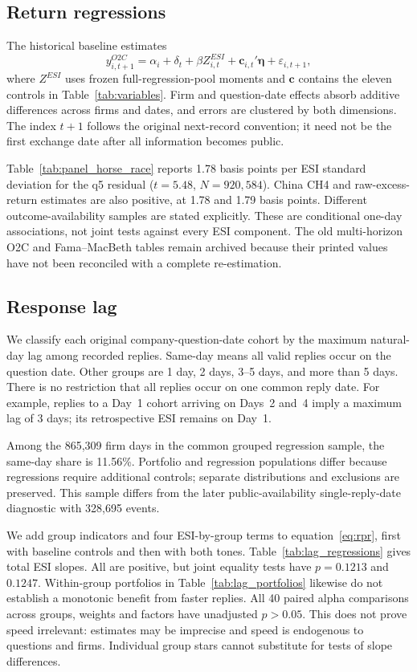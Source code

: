 \subsection{Return regressions}
The historical baseline estimates
\begin{equation}
y^{O2C}_{i,t+1}=\alpha_i+\delta_t+\beta Z^{ESI}_{i,t}+\boldsymbol c_{i,t}'\boldsymbol\eta+\varepsilon_{i,t+1},\label{eq:rpr}
\end{equation}
where $Z^{ESI}$ uses frozen full-regression-pool moments and $\boldsymbol c$ contains the eleven controls in Table~\ref{tab:variables}. Firm and question-date effects absorb additive differences across firms and dates, and errors are clustered by both dimensions. The index $t+1$ follows the original next-record convention; it need not be the first exchange date after all information becomes public.

Table~\ref{tab:panel_horse_race} reports 1.78 basis points per ESI standard deviation for the q5 residual ($t=5.48$, $N=920{,}584$). China CH4 and raw-excess-return estimates are also positive, at 1.78 and 1.79 basis points. Different outcome-availability samples are stated explicitly. These are conditional one-day associations, not joint tests against every ESI component. The old multi-horizon O2C and Fama--MacBeth tables remain archived because their printed values have not been reconciled with a complete re-estimation.


\subsection{Response lag}
We classify each original company-question-date cohort by the maximum natural-day lag among recorded replies. Same-day means all valid replies occur on the question date. Other groups are 1 day, 2 days, 3--5 days, and more than 5 days. There is no restriction that all replies occur on one common reply date. For example, replies to a Day~1 cohort arriving on Days~2 and~4 imply a maximum lag of 3 days; its retrospective ESI remains on Day~1.

Among the 865,309 firm days in the common grouped regression sample, the same-day share is 11.56\%. Portfolio and regression populations differ because regressions require additional controls; separate distributions and exclusions are preserved. This sample differs from the later public-availability single-reply-date diagnostic with 328,695 events.

We add group indicators and four ESI-by-group terms to equation~\eqref{eq:rpr}, first with baseline controls and then with both tones. Table~\ref{tab:lag_regressions} gives total ESI slopes. All are positive, but joint equality tests have $p=0.1213$ and $0.1247$. Within-group portfolios in Table~\ref{tab:lag_portfolios} likewise do not establish a monotonic benefit from faster replies. All 40 paired alpha comparisons across groups, weights and factors have unadjusted $p>0.05$. This does not prove speed irrelevant: estimates may be imprecise and speed is endogenous to questions and firms. Individual group stars cannot substitute for tests of slope differences.


